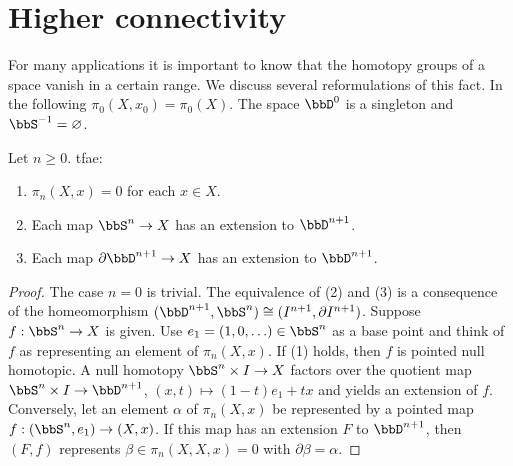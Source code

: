 \section{Higher connectivity}

For many applications it is important to know that the homotopy groups of a space vanish in a certain range. We discuss several reformulations of this fact. In the following $\pi_0(X,x_0)=\pi_0(X)$. The space $\bbD^0$ is a singleton and $\bbS^{-1}=\varnothing$.

\begin{prop}\label{prop 6.7.1 tomDieck} 
Let $n\geq 0$. \gls{tfae}:
\begin{enumerate}
    \item $\pi_n(X,x)=0$ for each $x\in X$.
    \item Each map $\bbS^n\to X$ has an extension to $\bbD^{n+1}$.
    \item Each map $\partial \bbD^{n+1}\to X$ has an extension to $\bbD^{n+1}$.
\end{enumerate}
\end{prop}
\begin{proof}
    The case $n=0$ is trivial. The equivalence of (2) and (3) is a consequence of the homeomorphism $(\bbD^{n+1},\bbS^n)\cong(I^{n+1},\partial I^{n+1})$. Suppose $f:\bbS^n\to X$ is given. Use $e_1=(1,0,\ldots)\in \bbS^n$ as a base point and think of $f$ as representing an element of $\pi_n(X,x)$. If (1) holds, then $f$ is pointed null homotopic. A null homotopy $\bbS^n\times I\to X$ factors over the quotient map $\bbS^n\times I\to \bbD^{n+1}$, $(x,t)\mapsto (1-t)e_1+tx$ and yields an extension of $f$. Conversely, let an element $\alpha$ of $\pi_n(X,x)$ be represented by a pointed map $f:(\bbS^n,e_1)\to (X,x)$. If this map has an extension $F$ to $\bbD^{n+1}$, then $(F,f)$ represents $\beta\in \pi_n(X,X,x)=0$ with $\partial\beta=\alpha$.
\end{proof}

